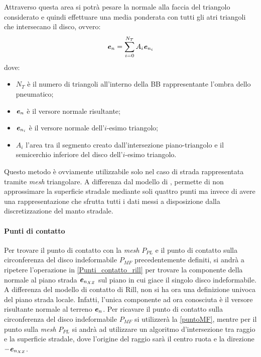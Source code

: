 Attraverso questa area si potrà pesare la normale alla faccia del triangolo considerato e quindi effettuare una media ponderata con tutti gli atri triangoli che intersecano il disco, ovvero:
%
\begin{equation}
\textbf{\textit{e}}_n = \sum_{i=0}^{N_T}A_i\textbf{\textit{e}}_{n_i}
\label{ponderata}
\end{equation}
%
dove:
\begin{itemize}
	\item $N_T$ è il numero di triangoli all'interno della \ac{BB} rappresentante l'ombra dello pneumatico;
	\item $\textbf{\textit{e}}_n$ è il versore normale risultante;
	\item $\textbf{\textit{e}}_{n_i}$ è il versore normale dell'$i$-esimo triangolo;
	\item $A_i$ l'area tra il segmento creato dall'intersezione piano-triangolo e il semicerchio inferiore del disco dell'$i$-esimo triangolo.
\end{itemize}

Questo metodo è ovviamente utilizzabile solo nel caso di strada rappresentata tramite \textit{mesh} triangolare. A differenza dal modello di \cite{Rill}, permette di non approssimare la superficie stradale mediante soli quattro punti ma invece di avere una rappresentazione che sfrutta tutti i dati messi a disposizione dalla discretizzazione del manto stradale.
%
\paragraph{Punti di contatto}
Per trovare il punto di contatto con la \textit{mesh} $P_{PL}$ e il punto di contatto sulla circonferenza del disco indeformabile $P_{MF}$ precedentemente definiti, si andrà a ripetere l'operazione in \ref{Punti_contatto_rill} per trovare la componente della normale al piano strada $\textbf{\textit{e}}_{n_{XZ}}$ sul piano in cui giace il singolo disco indeformabile. A differenza del modello di contatto di Rill, non si ha ora una definizione univoca del piano strada locale. Infatti, l'unica componente ad ora conosciuta è il versore risultante normale al terreno $\textbf{\textit{e}}_n$. Per ricavare il punto di contatto sulla circonferenza del disco indeformabile $P_{MF}$ si utilizzerà la \eqref{puntoMF}, mentre per il punto sulla \textit{mesh} $P_{PL}$ si andrà ad utilizzare un algoritmo d'intersezione tra raggio e la superficie stradale, dove l'origine del raggio sarà il centro ruota e la direzione $-\textbf{\textit{e}}_{n_{XZ}}$.
%
